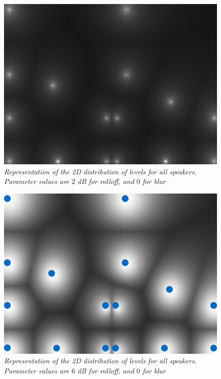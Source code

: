 \documentclass[twoside,10pt]{article}
\begin{document}
\begin{figure}[ht]
\centerline{\includegraphics[scale=0.5]{all_r_2_b_0}}
\caption{{\it Representation of the 2D distribution of levels for all speakers. Parameter values are $2$ dB for rolloff, and $0$ for blur}}  
\label{fig:allspk1}
\end{figure}

\begin{figure}[ht]
\centerline{\includegraphics[scale=0.5]{all_r_6_b_0}}
\caption{{\it Representation of the 2D distribution of levels for all speakers. Parameter values are $6$ dB for rolloff, and $0$ for blur}}  
\label{fig:allspk2}
\end{figure}
\end{document}
